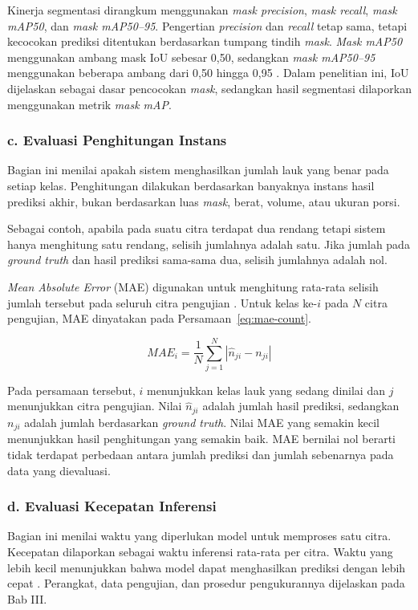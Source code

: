 Kinerja segmentasi dirangkum menggunakan \textit{mask precision}, \textit{mask recall}, \textit{mask mAP50}, dan \textit{mask mAP50--95}. Pengertian \textit{precision} dan \textit{recall} tetap sama, tetapi kecocokan prediksi ditentukan berdasarkan tumpang tindih \textit{mask}. \textit{Mask mAP50} menggunakan ambang mask IoU sebesar 0,50, sedangkan \textit{mask mAP50--95} menggunakan beberapa ambang dari 0,50 hingga 0,95 \cite{qiu2025,syafira2025}. Dalam penelitian ini, IoU dijelaskan sebagai dasar pencocokan \textit{mask}, sedangkan hasil segmentasi dilaporkan menggunakan metrik \textit{mask mAP}.

\subsubsection*{c. Evaluasi Penghitungan Instans}

Bagian ini menilai apakah sistem menghasilkan jumlah lauk yang benar pada setiap kelas. Penghitungan dilakukan berdasarkan banyaknya instans hasil prediksi akhir, bukan berdasarkan luas \textit{mask}, berat, volume, atau ukuran porsi.

Sebagai contoh, apabila pada suatu citra terdapat dua rendang tetapi sistem hanya menghitung satu rendang, selisih jumlahnya adalah satu. Jika jumlah pada \textit{ground truth} dan hasil prediksi sama-sama dua, selisih jumlahnya adalah nol.

\textit{Mean Absolute Error} (MAE) digunakan untuk menghitung rata-rata selisih jumlah tersebut pada seluruh citra pengujian \cite{nguyen2022sibnet}. Untuk kelas ke-$i$ pada $N$ citra pengujian, MAE dinyatakan pada Persamaan~\ref{eq:mae-count}.

\begin{equation}
    MAE_i = \frac{1}{N} \sum_{j=1}^{N} \left|\hat{n}_{ji} - n_{ji}\right|
    \label{eq:mae-count}
\end{equation}

Pada persamaan tersebut, $i$ menunjukkan kelas lauk yang sedang dinilai dan $j$ menunjukkan citra pengujian. Nilai $\hat{n}_{ji}$ adalah jumlah hasil prediksi, sedangkan $n_{ji}$ adalah jumlah berdasarkan \textit{ground truth}. Nilai MAE yang semakin kecil menunjukkan hasil penghitungan yang semakin baik. MAE bernilai nol berarti tidak terdapat perbedaan antara jumlah prediksi dan jumlah sebenarnya pada data yang dievaluasi.

\subsubsection*{d. Evaluasi Kecepatan Inferensi}

Bagian ini menilai waktu yang diperlukan model untuk memproses satu citra. Kecepatan dilaporkan sebagai waktu inferensi rata-rata per citra. Waktu yang lebih kecil menunjukkan bahwa model dapat menghasilkan prediksi dengan lebih cepat \cite{syafira2025}. Perangkat, data pengujian, dan prosedur pengukurannya dijelaskan pada Bab III.
